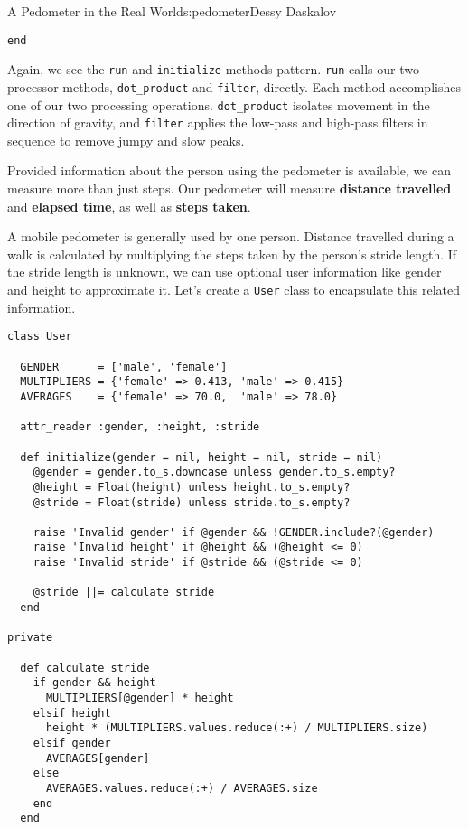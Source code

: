 \begin{aosachapter}{A Pedometer in the Real World}{s:pedometer}{Dessy Daskalov}
\begin{verbatim}
end
\end{verbatim}

Again, we see the \texttt{run} and \texttt{initialize} methods pattern.
\texttt{run} calls our two processor methods, \texttt{dot\_product} and
\texttt{filter}, directly. Each method accomplishes one of our two
processing operations. \texttt{dot\_product} isolates movement in the
direction of gravity, and \texttt{filter} applies the low-pass and
high-pass filters in sequence to remove jumpy and slow peaks.

\label{pedometer-functionality}

Provided information about the person using the pedometer is available,
we can measure more than just steps. Our pedometer will measure
\textbf{distance travelled} and \textbf{elapsed time}, as well as
\textbf{steps taken}.

\label{distance-travelled}

A mobile pedometer is generally used by one person. Distance travelled
during a walk is calculated by multiplying the steps taken by the
person's stride length. If the stride length is unknown, we can use
optional user information like gender and height to approximate it.
Let's create a \texttt{User} class to encapsulate this related
information.

\begin{verbatim}
class User

  GENDER      = ['male', 'female']
  MULTIPLIERS = {'female' => 0.413, 'male' => 0.415}
  AVERAGES    = {'female' => 70.0,  'male' => 78.0}

  attr_reader :gender, :height, :stride

  def initialize(gender = nil, height = nil, stride = nil)
    @gender = gender.to_s.downcase unless gender.to_s.empty?
    @height = Float(height) unless height.to_s.empty?
    @stride = Float(stride) unless stride.to_s.empty?

    raise 'Invalid gender' if @gender && !GENDER.include?(@gender)
    raise 'Invalid height' if @height && (@height <= 0)
    raise 'Invalid stride' if @stride && (@stride <= 0)

    @stride ||= calculate_stride
  end

private

  def calculate_stride
    if gender && height
      MULTIPLIERS[@gender] * height
    elsif height
      height * (MULTIPLIERS.values.reduce(:+) / MULTIPLIERS.size)
    elsif gender
      AVERAGES[gender]
    else
      AVERAGES.values.reduce(:+) / AVERAGES.size
    end
  end


\end{verbatim}
\end{aosachapter}
